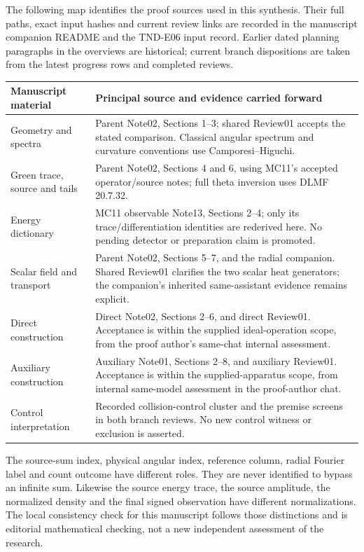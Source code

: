 The following map identifies the proof sources used in this synthesis.
Their full paths, exact input hashes and current review links are recorded
in the manuscript companion README and the TND-E06 input record. Earlier
dated planning paragraphs in the overviews are historical; current
branch dispositions are taken from the latest progress rows and
completed reviews.

\begin{center}\small
\begin{tabularx}{\textwidth}{@{}>{\raggedright\arraybackslash}p{}Y@{}}\toprule
Manuscript material & Principal source and evidence carried forward \\\midrule
Geometry and spectra & Parent Note02, Sections 1--3; shared Review01 accepts the stated comparison. Classical angular spectrum and curvature conventions use Camporesi--Higuchi. \\
Green trace, source and tails & Parent Note02, Sections 4 and 6, using MC11's accepted operator/source notes; full theta inversion uses DLMF 20.7.32. \\
Energy dictionary & MC11 observable Note13, Sections 2--4; only its trace/differentiation identities are rederived here. No pending detector or preparation claim is promoted. \\
Scalar field and transport & Parent Note02, Sections 5--7, and the radial companion. Shared Review01 clarifies the two scalar heat generators; the companion's inherited same-assistant evidence remains explicit. \\
Direct construction & Direct Note02, Sections 2--6, and direct Review01. Acceptance is within the supplied ideal-operation scope, from the proof author's same-chat internal assessment. \\
Auxiliary construction & Auxiliary Note01, Sections 2--8, and auxiliary Review01. Acceptance is within the supplied-apparatus scope, from internal same-model assessment in the proof-author chat. \\
Control interpretation & Recorded collision-control cluster and the premise screens in both branch reviews. No new control witness or exclusion is asserted. \\
\bottomrule\end{tabularx}
\end{center}

The source-sum index, physical angular index, reference column, radial
Fourier label and count outcome have different roles. They are never
identified to bypass an infinite sum. Likewise the source energy trace,
the source amplitude, the normalized density and the final signed
observation have different normalizations. The local consistency check
for this manuscript follows those distinctions and is editorial
mathematical checking, not a new independent assessment of the research.
